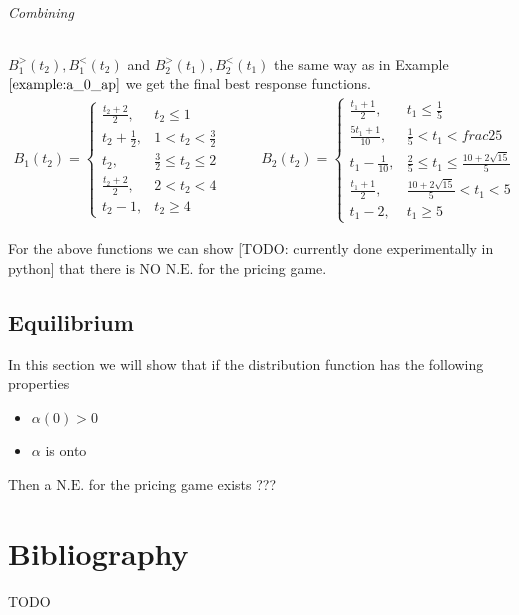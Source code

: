 \documentclass[10pt,a4paper]{book}
\newcommand{\NE}{\mathrm{N.E.}}
\theoremstyle{definition}
\theoremstyle{comment}
\begin{document}
\subparagraph{Combining} $B_1^>(t_2), B_1^<(t_2)$ and $B_2^>(t_1), B_2^<(t_1)$ the same way as in Example $\ref{example:a_0_ap}$ we get the final best response functions.
\begin{equation*}
	\begin{aligned}
		B_1(t_2) =
		\begin{cases}
			\frac{t_2 + 2}2, & t_2 \le 1 \\
			t_2 + \frac12, & 1 < t_2 < \frac32 \\
			t_2, & \frac32 \le t_2 \le 2 \\
			\frac{t_2 + 2}2, & 2 < t_2 < 4 \\
			t_2 - 1, & t_2 \ge 4
		\end{cases}
	\end{aligned}
	\qquad
	\begin{aligned}
		B_2(t_2) =
		\begin{cases}
			\frac{t_1 + 1}2, & t_1 \le \frac15 \\
			\frac{5 t_1 + 1}{10}, & \frac15 < t_1 < frac25 \\
			t_1 - \frac1{10}, & \frac25 \le t_1 \le \frac{10 + 2 \sqrt{15}}5 \\
			\frac{t_1 + 1}2, & \frac{10 + 2 \sqrt{15}}5 < t_1 < 5 \\
			t_1 - 2, & t_1 \ge 5
		\end{cases}
	\end{aligned}
\end{equation*}

For the above functions we can show [TODO: currently done experimentally in python] that there is NO $\NE$ for the pricing game.


\section{Equilibrium}

In this section we will show that if the distribution function has the following properties
\begin{itemize}
	\item $\alpha(0) > 0$
	\item $\alpha$ is onto
\end{itemize}
Then a $\NE$ for the pricing game exists ???


\cleardoublepage
{}
{}

\chapter*{Bibliography}
TODO
\end{document}
